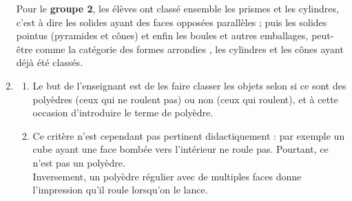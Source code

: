 \begin{corrige}
\begin{enumerate}
   Pour le \textbf{groupe 2}, les élèves ont classé ensemble les prismes et les cylindres, c'est à dire les solides ayant des faces opposées parallèles ; puis les solides \og pointus \fg{} (pyramides et cônes) et enfin les boules et autres emballages, peut-être comme la catégorie des formes \og arrondies \fg{}, les cylindres et les cônes ayant déjà été classés. 
   \item 
   \begin{enumerate}
      \item Le but de l'enseignant est de les faire classer les objets selon si ce sont des polyèdres (ceux qui ne roulent pas) ou non (ceux qui roulent), et à cette occasion d'introduire le terme de polyèdre.
      \item Ce critère n'est cependant pas pertinent didactiquement : par exemple un cube ayant une face bombée vers l'intérieur ne roule pas. Pourtant, ce n'est pas un polyèdre. \\
      Inversement, un polyèdre régulier avec de multiples faces donne l'impression qu'il roule lorsqu'on le lance.
    \end{enumerate}
\end{enumerate}
\end{corrige}

\vfill
\pagebreak

